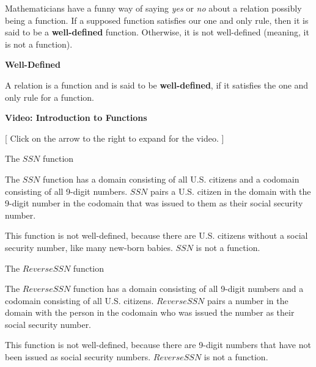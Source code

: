\documentclass{ximera}
\begin{document}
Mathematicians have a funny way of saying \textit{yes} or \textit{no} about a relation possibly being a function. If a supposed function satisfies our one and only rule, then it is said to be a \textbf{well-defined} function.  Otherwise, it is not well-defined (meaning, it is not a function).




\begin{definition} \textbf{\textcolor{green!50!black}{Well-Defined}}

A relation is a function and is said to be \textbf{well-defined}, if it satisfies the one and only rule for a function.
\end{definition}










\begin{onlineOnly}
\begin{explanation} \textbf{\textcolor{red!75!green}{Video: Introduction to Functions}} 

[ Click on the arrow to the right to expand for the video. ]
\begin{expandable} 

\begin{center}
\end{center}

\end{expandable}

\end{explanation}
\end{onlineOnly}





\begin{example} The $SSN$ function

The $SSN$ function has a domain consisting of all U.S. citizens and a codomain consisting of all 9-digit numbers.  $SSN$ pairs a U.S. citizen in the domain with the 9-digit number in the codomain that was issued to them as their social security number. 


This function is not well-defined, because there are U.S. citizens without a social security number, like many new-born babies.   $SSN$ is not a function.
\end{example}


\begin{example} The $ReverseSSN$ function

The $ReverseSSN$ function has a domain consisting of all 9-digit numbers and a codomain consisting of all U.S. citizens.  $ReverseSSN$ pairs a number in the domain with the person in the codomain who was issued the number as their social security number. 


This function is not well-defined, because there are 9-digit numbers that have not been issued as social security numbers.  $ReverseSSN$ is not a function.
\end{example}
\end{document}
